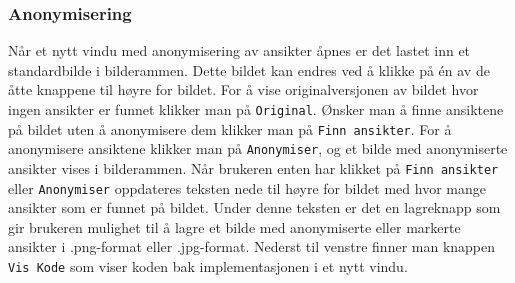 \subsubsection{Anonymisering}
Når et nytt vindu med anonymisering av ansikter åpnes er det lastet inn et standardbilde i bilderammen. Dette bildet kan endres ved å klikke på én av de åtte knappene til høyre for bildet. For å vise originalversjonen av bildet hvor ingen ansikter er funnet klikker man på \texttt{Original}. Ønsker man å finne ansiktene på bildet uten å anonymisere dem klikker man på \texttt{Finn ansikter}. For å anonymisere ansiktene klikker man på \texttt{Anonymiser}, og et bilde med anonymiserte ansikter vises i bilderammen. Når brukeren enten har klikket på \texttt{Finn ansikter} eller \texttt{Anonymiser} oppdateres teksten nede til høyre for bildet med hvor mange ansikter som er funnet på bildet. Under denne teksten er det en lagreknapp som gir brukeren mulighet til å lagre et bilde med anonymiserte eller markerte ansikter i .png-format eller .jpg-format. Nederst til venstre finner man knappen \texttt{Vis Kode} som viser koden bak implementasjonen i et nytt vindu. 